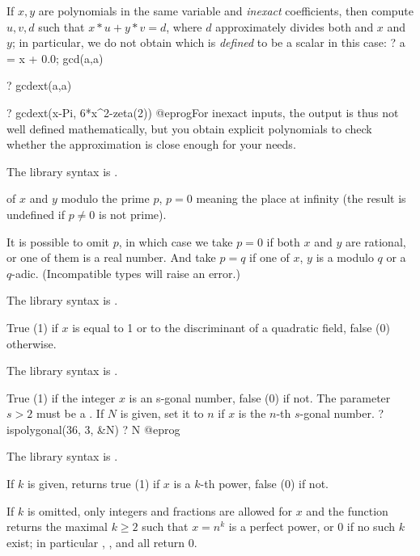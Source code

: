 If $x,y$ are polynomials in the same variable and \emph{inexact}
coefficients, then compute $u,v,d$ such that $x*u+y*v = d$, where $d$
approximately divides both and $x$ and $y$; in particular, we do not obtain
 which is \emph{defined} to be a scalar in this case:
\bprog
? a = x + 0.0; gcd(a,a)

? gcdext(a,a)

? gcdext(x-Pi, 6*x^2-zeta(2))
@eprog\noindent For inexact inputs, the output is thus not well defined
mathematically, but you obtain explicit polynomials to check whether the
approximation is close enough for your needs.

The library syntax is .

\label{se:hilbert}
 of $x$ and $y$ modulo the prime $p$, $p=0$ meaning
the place at infinity (the result is undefined if $p\neq 0$ is not prime).

It is possible to omit $p$, in which case we take $p = 0$ if both $x$
and $y$ are rational, or one of them is a real number. And take $p = q$
if one of $x$, $y$ is a  modulo $q$ or a $q$-adic. (Incompatible
types will raise an error.)

The library syntax is .

\label{se:isfundamental}
True (1) if $x$ is equal to 1 or to the discriminant of a quadratic
field, false (0) otherwise.

The library syntax is .

\label{se:ispolygonal}
True (1) if the integer $x$ is an s-gonal number, false (0) if not.
The parameter $s > 2$ must be a . If $N$ is given, set it to $n$
if $x$ is the $n$-th $s$-gonal number.
\bprog
? ispolygonal(36, 3, &N)
? N
@eprog

The library syntax is .

\label{se:ispower}
If $k$ is given, returns true (1) if $x$ is a $k$-th power, false
(0) if not.

If $k$ is omitted, only integers and fractions are allowed for $x$ and the
function returns the maximal $k \geq 2$ such that $x = n^k$ is a perfect
power, or 0 if no such $k$ exist; in particular ,
, and  all return $0$.


